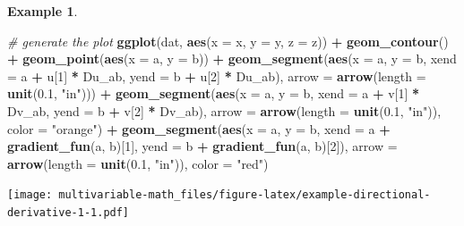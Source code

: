 \documentclass[
]{book}
\newenvironment{Shaded}{\begin{snugshade}}{\end{snugshade}}
\newcommand{\CommentTok}[1]{\textcolor[rgb]{0.56,0.35,0.01}{\textit{#1}}}
\newcommand{\DataTypeTok}[1]{\textcolor[rgb]{0.13,0.29,0.53}{#1}}
\newcommand{\DecValTok}[1]{\textcolor[rgb]{0.00,0.00,0.81}{#1}}
\newcommand{\FloatTok}[1]{\textcolor[rgb]{0.00,0.00,0.81}{#1}}
\newcommand{\KeywordTok}[1]{\textcolor[rgb]{0.13,0.29,0.53}{\textbf{#1}}}
\newcommand{\NormalTok}[1]{#1}
\newcommand{\OperatorTok}[1]{\textcolor[rgb]{0.81,0.36,0.00}{\textbf{#1}}}
\newcommand{\StringTok}[1]{\textcolor[rgb]{0.31,0.60,0.02}{#1}}
\theoremstyle{definition}
\theoremstyle{definition}
\newtheorem{example}{Example}[chapter]
\theoremstyle{definition}
\theoremstyle{definition}
\theoremstyle{remark}
\begin{document}
\begin{example}
\begin{Shaded}
\begin{Highlighting}[]
\CommentTok{# generate the plot}
\KeywordTok{ggplot}\NormalTok{(dat, }\KeywordTok{aes}\NormalTok{(}\DataTypeTok{x =}\NormalTok{ x, }\DataTypeTok{y =}\NormalTok{ y, }\DataTypeTok{z =}\NormalTok{ z)) }\OperatorTok{+}
\StringTok{        }\KeywordTok{geom_contour}\NormalTok{() }\OperatorTok{+}\StringTok{ }
\StringTok{        }\KeywordTok{geom_point}\NormalTok{(}\KeywordTok{aes}\NormalTok{(}\DataTypeTok{x =}\NormalTok{ a, }\DataTypeTok{y =}\NormalTok{ b)) }\OperatorTok{+}
\StringTok{        }\KeywordTok{geom_segment}\NormalTok{(}\KeywordTok{aes}\NormalTok{(}\DataTypeTok{x =}\NormalTok{ a, }\DataTypeTok{y =}\NormalTok{ b, }\DataTypeTok{xend =}\NormalTok{ a }\OperatorTok{+}\StringTok{ }\NormalTok{u[}\DecValTok{1}\NormalTok{] }\OperatorTok{*}\StringTok{ }\NormalTok{Du_ab, }\DataTypeTok{yend =}\NormalTok{ b }\OperatorTok{+}\StringTok{ }\NormalTok{u[}\DecValTok{2}\NormalTok{] }\OperatorTok{*}\StringTok{ }\NormalTok{Du_ab), }
                     \DataTypeTok{arrow =} \KeywordTok{arrow}\NormalTok{(}\DataTypeTok{length =} \KeywordTok{unit}\NormalTok{(}\FloatTok{0.1}\NormalTok{, }\StringTok{"in"}\NormalTok{))) }\OperatorTok{+}
\StringTok{        }\KeywordTok{geom_segment}\NormalTok{(}\KeywordTok{aes}\NormalTok{(}\DataTypeTok{x =}\NormalTok{ a, }\DataTypeTok{y =}\NormalTok{ b, }\DataTypeTok{xend =}\NormalTok{ a }\OperatorTok{+}\StringTok{ }\NormalTok{v[}\DecValTok{1}\NormalTok{] }\OperatorTok{*}\StringTok{ }\NormalTok{Dv_ab, }\DataTypeTok{yend =}\NormalTok{ b }\OperatorTok{+}\StringTok{ }\NormalTok{v[}\DecValTok{2}\NormalTok{] }\OperatorTok{*}\StringTok{ }\NormalTok{Dv_ab), }
                     \DataTypeTok{arrow =} \KeywordTok{arrow}\NormalTok{(}\DataTypeTok{length =} \KeywordTok{unit}\NormalTok{(}\FloatTok{0.1}\NormalTok{, }\StringTok{"in"}\NormalTok{)), }\DataTypeTok{color =} \StringTok{"orange"}\NormalTok{) }\OperatorTok{+}
\StringTok{        }\KeywordTok{geom_segment}\NormalTok{(}\KeywordTok{aes}\NormalTok{(}\DataTypeTok{x =}\NormalTok{ a, }\DataTypeTok{y =}\NormalTok{ b, }\DataTypeTok{xend =}\NormalTok{ a }\OperatorTok{+}\StringTok{ }\KeywordTok{gradient_fun}\NormalTok{(a, b)[}\DecValTok{1}\NormalTok{], }\DataTypeTok{yend =}\NormalTok{ b }\OperatorTok{+}\StringTok{ }\KeywordTok{gradient_fun}\NormalTok{(a, b)[}\DecValTok{2}\NormalTok{]), }
                     \DataTypeTok{arrow =} \KeywordTok{arrow}\NormalTok{(}\DataTypeTok{length =} \KeywordTok{unit}\NormalTok{(}\FloatTok{0.1}\NormalTok{, }\StringTok{"in"}\NormalTok{)), }\DataTypeTok{color =} \StringTok{"red"}\NormalTok{) }
\end{Highlighting}
\end{Shaded}

\texttt{[image: multivariable-math\_files/figure-latex/example-directional-derivative-1-1.pdf]}
\end{example}
\end{document}
